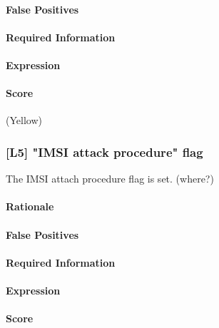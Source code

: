 \documentclass[a4paper,11pt,notitlepage,bigheadings,oneside]{scrartcl}
\begin{document}
\TBD{}

\paragraph{False Positives}

\TBD{}

\paragraph{Required Information}

\TBD{}

\paragraph{Expression}

\TBD{}

\paragraph{Score}

\TBD{} (Yellow)

\subsubsection{[L5] "IMSI attack procedure" flag}

The IMSI attach procedure flag is set. (where?)

\paragraph{Rationale}

\TBD{}

\paragraph{False Positives}

\TBD{}

\paragraph{Required Information}

\TBD{}

\paragraph{Expression}

\TBD{}

\paragraph{Score}
\end{document}
